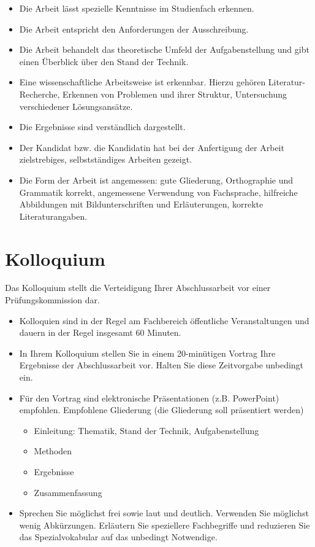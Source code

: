 \begin{itemize}
\item Die Arbeit lässt spezielle Kenntnisse im Studienfach erkennen.
\item Die Arbeit entspricht den Anforderungen der Ausschreibung.
\item Die Arbeit behandelt das theoretische Umfeld der Aufgabenstellung und gibt einen Überblick über den Stand der Technik.
\item Eine wissenschaftliche Arbeitsweise ist erkennbar. Hierzu gehören Literatur-Recherche, Erkennen von Problemen und ihrer Struktur, Untersuchung verschiedener Lösungsansätze. 
\item Die Ergebnisse sind verständlich dargestellt.
\item Der Kandidat bzw. die Kandidatin hat bei der Anfertigung der Arbeit zielstrebiges, selbstständiges Arbeiten gezeigt.
\item Die Form der Arbeit ist angemessen: gute Gliederung, Orthographie und Grammatik korrekt, angemessene Verwendung von Fachsprache, hilfreiche Abbildungen mit Bildunterschriften und Erläuterungen, korrekte Literaturangaben.
\end{itemize}


\section{Kolloquium}
Das Kolloquium stellt die Verteidigung Ihrer Abschlussarbeit vor einer Prüfungskommission dar.

\begin{itemize}
\item Kolloquien sind in der Regel am Fachbereich öffentliche Veranstaltungen und dauern in der Regel insgesamt 60 Minuten.
\item In Ihrem Kolloquium stellen Sie in einem 20-minütigen Vortrag Ihre Ergebnisse der Abschlussarbeit vor. Halten Sie diese Zeitvorgabe unbedingt ein.
\item Für den Vortrag sind elektronische Präsentationen (z.B. PowerPoint) empfohlen.
Empfohlene Gliederung (die Gliederung soll präsentiert werden)
\begin{itemize}
\item Einleitung: Thematik, Stand der Technik, Aufgabenstellung
\item Methoden
\item Ergebnisse
\item Zusammenfassung
\end{itemize}

\item Sprechen Sie möglichst frei sowie laut und deutlich. Verwenden Sie möglichst wenig Abkürzungen. Erläutern Sie speziellere Fachbegriffe und reduzieren Sie das Spezialvokabular auf das unbedingt Notwendige.

\end{itemize}

